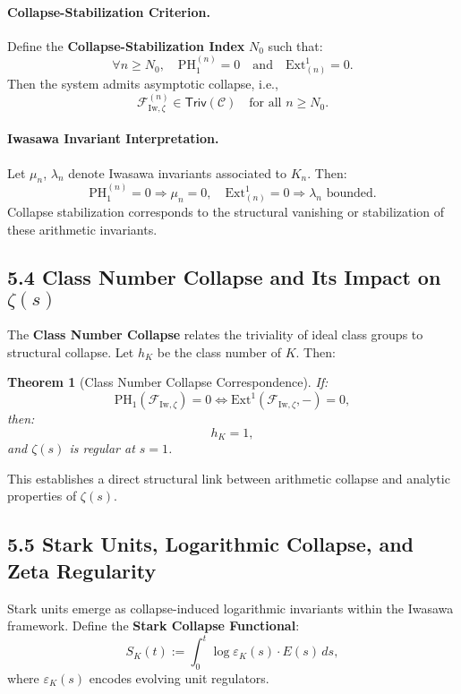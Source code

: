 \documentclass[11pt]{article}
\newtheorem{theorem}{Theorem}[section]
\begin{document}
\paragraph{Collapse-Stabilization Criterion.}
Define the \textbf{Collapse-Stabilization Index} $N_0$ such that:
\[
\forall n \geq N_0, \quad \mathrm{PH}_1^{(n)} = 0 \quad \text{and} \quad \mathrm{Ext}^1_{(n)} = 0.
\]
Then the system admits asymptotic collapse, i.e., 
\[
\mathcal{F}_{\mathrm{Iw}, \zeta}^{(n)} \in \mathsf{Triv}(\mathcal{C}) \quad \text{for all } n \geq N_0.
\]

\paragraph{Iwasawa Invariant Interpretation.}
Let $\mu_n$, $\lambda_n$ denote Iwasawa invariants associated to $K_n$. Then:
\[
\mathrm{PH}_1^{(n)} = 0 \Rightarrow \mu_n = 0, \quad \mathrm{Ext}^1_{(n)} = 0 \Rightarrow \lambda_n \text{ bounded}.
\]
Collapse stabilization corresponds to the structural vanishing or stabilization of these arithmetic invariants.

\subsection*{5.4 Class Number Collapse and Its Impact on $\zeta(s)$}

The \textbf{Class Number Collapse} relates the triviality of ideal class groups to structural collapse. Let $h_K$ be the class number of $K$. Then:

\begin{theorem}[Class Number Collapse Correspondence]
If:
\[
\mathrm{PH}_1(\mathcal{F}_{\mathrm{Iw}, \zeta}) = 0 \iff \mathrm{Ext}^1(\mathcal{F}_{\mathrm{Iw}, \zeta}, -) = 0,
\]
then:
\[
h_K = 1,
\]
and $\zeta(s)$ is regular at $s = 1$.
\end{theorem}

This establishes a direct structural link between arithmetic collapse and analytic properties of $\zeta(s)$.

\subsection*{5.5 Stark Units, Logarithmic Collapse, and Zeta Regularity}

Stark units emerge as collapse-induced logarithmic invariants within the Iwasawa framework. Define the \textbf{Stark Collapse Functional}:
\[
S_K(t) := \int_0^t \log \varepsilon_K(s) \cdot E(s) \, ds,
\]
where $\varepsilon_K(s)$ encodes evolving unit regulators.
\end{document}
